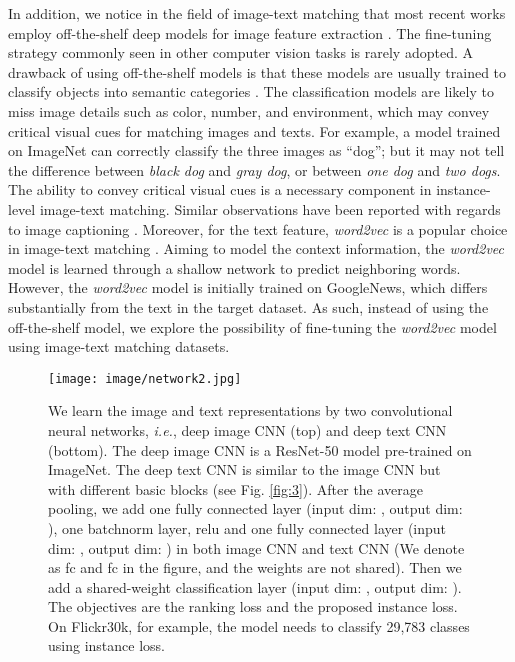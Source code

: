 \documentclass[10pt,final,journal]{IEEEtran}
\newcommand{\ie}{\mbox{\emph{i.e.}}}
\begin{document}
In addition, we notice in the field of image-text matching that most recent works 
employ off-the-shelf deep models for image feature extraction \cite{mao2014deep,klein2015associating,lin2016leveraging,lev2016rnn,wang2016learning,nam2016dual,huang2016instance,niu2017hierarchical,wang2017learning,reed2016learning}. The fine-tuning strategy commonly seen in other computer vision tasks \cite{zhang2014part,chen2016deeplab,zheng2016person} is rarely adopted. 
A drawback of using off-the-shelf models is that these models are usually trained to classify objects into semantic categories \cite{krizhevsky2012imagenet,simonyan2014very,he2016deep}. The classification models are likely to miss image details such as color, number, and environment, which may convey critical visual cues for matching images and texts. For example, a model trained on ImageNet \cite{russakovsky2015imagenet} can correctly classify the three images as ``dog''; but it may not tell the difference between \emph{black dog} and \emph{gray dog}, or between \emph{one dog} and \emph{two dogs}. The ability to convey critical visual cues is a necessary component in instance-level image-text matching. Similar observations have been reported with regards to image captioning \cite{vinyals2017show}. Moreover, for the text feature, \emph{word2vec} \cite{mikolov2013efficient} is a popular choice in image-text matching \cite{klein2015associating,karpathy2015deep,wang2016learning,niu2017hierarchical}.
Aiming to model the context information, the \emph{word2vec} model is learned through a shallow network to predict neighboring words. However, the \emph{word2vec} model is initially trained on GoogleNews, which differs substantially from the text in the target dataset. As such, instead of using the off-the-shelf model, we explore the possibility of fine-tuning the \emph{word2vec} model using image-text matching datasets. 


\begin{figure*}[t]
\begin{center}
\texttt{[image: image/network2.jpg]}
\end{center}
   \caption{We learn the image and text representations by two convolutional neural networks, \ie, deep image CNN (top) and deep text CNN (bottom). The deep image CNN is a ResNet-50 model \cite{he2016deep} pre-trained on ImageNet. The deep text CNN is similar to the image CNN but with different basic blocks (see Fig. \ref{fig:3}). After the average pooling, we add one fully connected layer (input dim: , output dim: ), one batchnorm layer, relu and one fully connected layer (input dim: , output dim: ) in both image CNN and text CNN (We denote as fc and fc in the figure, and the weights are not shared). Then we add a shared-weight  classification layer (input dim: , output dim: ). The objectives are the ranking loss and the proposed instance loss. On Flickr30k, for example, the model needs to classify 29,783 classes using instance loss.}
\label{fig:network}
\end{figure*}
\end{document}
